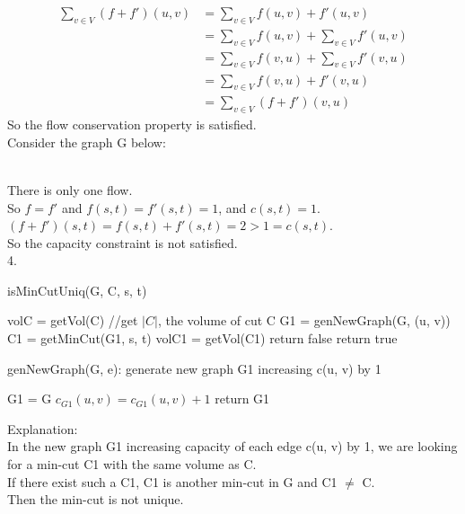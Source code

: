\documentclass[a4paper]{article}
\begin{document}
\begin{align}
	\sum_{v \in V}(f+f')(u,v) & = \sum_{v \in V} f(u,v) + f'(u,v)               \\
	                          & = \sum_{v \in V} f(u,v) + \sum_{v \in V}f'(u,v) \\
	                          & = \sum_{v \in V} f(v,u) + \sum_{v \in V}f'(v,u) \\
	                          & = \sum_{v \in V} f(v,u) + f'(v,u)               \\
	                          & = \sum_{v \in V}(f+f')(v,u)                     
\end{align}
So the flow conservation property is satisfied.\\

Consider the graph G below:\\
\\
There is only one flow. \\
So $f=f'$ and $f(s, t) = f'(s, t) = 1$, and $c(s,t) = 1$.\\
$(f+f')(s,t) = f(s, t) + f'(s, t) = 2 > 1 = c(s,t)$.\\
So the capacity constraint is not satisfied.\\

4.\\
\begin{algorithm}[H]
	\caption{isMinCutUniq(G, C, s, t)}
	volC = getVol(C) //get $|C|$, the volume of cut C \;
	{
		G1 = genNewGraph(G, (u, v))\;
		C1 = getMinCut(G1, s, t)\;
		volC1 = getVol(C1)\;
		{
			return false
		}
		return true
	}
\end{algorithm}

\begin{algorithm}[H]
	\caption{genNewGraph(G, e): generate new graph G1 increasing c(u, v) by 1}
	G1 = G\;
	$c_{G1}(u, v) = c_{G1}(u, v) + 1$\;
	return G1\;
\end{algorithm}

Explanation:\\
In the new graph G1 increasing capacity of each edge c(u, v) by 1, we are looking for a min-cut C1 with the same volume as C. \\
If there exist such a C1, C1 is another min-cut in G and C1 $\neq$ C.\\
Then the min-cut is not unique.\\
\end{document}
